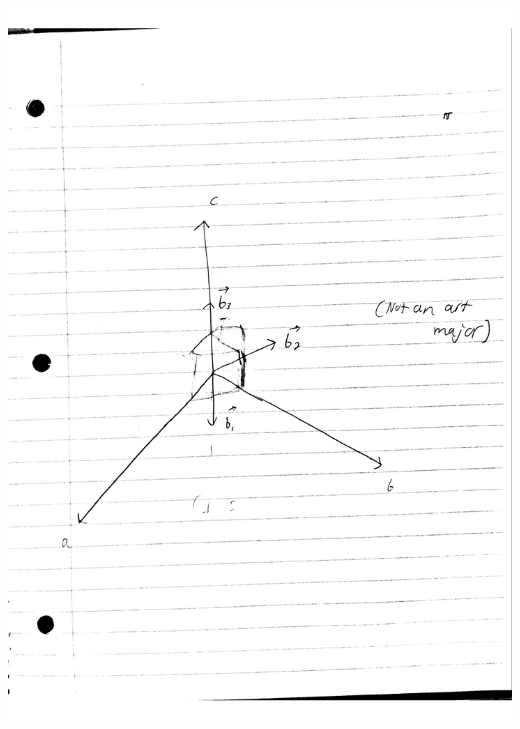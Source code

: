 \documentclass{article}
\begin{document}
\includegraphics[scale = 0.75]{reciprocal sketch.pdf}
\end{document}
